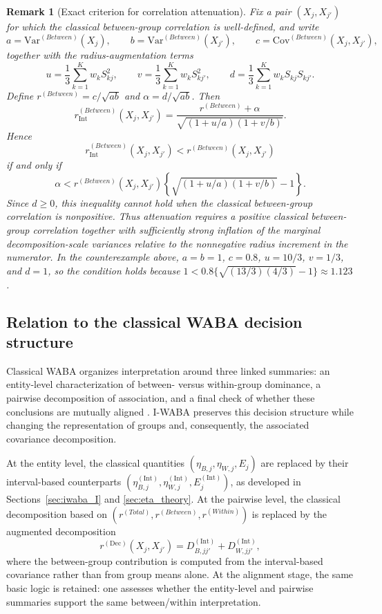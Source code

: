 \documentclass[preprint, times, 12pt, authoryear]{elsarticle}
\newtheorem{remark}{Remark}
\begin{document}
\begin{remark}[Exact criterion for correlation attenuation]\label{rem:corr_attenuation}
	Fix a pair $(X_j,X_{j'})$ for which the classical between-group correlation is well-defined, and write
	\[
	a=\mathrm{Var}^{(Between)}(X_j),\qquad
	b=\mathrm{Var}^{(Between)}(X_{j'}),\qquad
	c=\mathrm{Cov}^{(Between)}(X_j,X_{j'}),
	\]
	together with the radius-augmentation terms
	\[
	u=\frac13\sum_{k=1}^K w_k S_{kj}^2,\qquad
	v=\frac13\sum_{k=1}^K w_k S_{kj'}^2,\qquad
	d=\frac13\sum_{k=1}^K w_k S_{kj}S_{kj'}.
	\]
	Define \(r^{(Between)}=c/\sqrt{ab}\) and \(\alpha=d/\sqrt{ab}\). Then
	\[
	r_{\mathrm{Int}}^{(Between)}(X_j,X_{j'})
	=
	\frac{r^{(Between)}+\alpha}
	{\sqrt{\left(1+u/a\right)\left(1+v/b\right)}}.
	\]
	Hence
	\[
	r_{\mathrm{Int}}^{(Between)}(X_j,X_{j'})
	<
	r^{(Between)}(X_j,X_{j'})
	\]
	if and only if
	\[
	\alpha
	<
	r^{(Between)}(X_j,X_{j'})
	\left\{
	\sqrt{\left(1+u/a\right)\left(1+v/b\right)}-1
	\right\}.
	\]
	Since \(d\ge 0\), this inequality cannot hold when the classical between-group correlation is nonpositive. Thus attenuation requires a positive classical between-group correlation together with sufficiently strong inflation of the marginal decomposition-scale variances relative to the nonnegative radius increment in the numerator. In the counterexample above, \(a=b=1\), \(c=0.8\), \(u=10/3\), \(v=1/3\), and \(d=1\), so the condition holds because \(1 < 0.8\{\sqrt{(13/3)(4/3)}-1\}\approx 1.123\).
\end{remark}
 
 \subsection{Relation to the classical WABA decision structure}\label{sec:waba_testing}
 
 Classical WABA organizes interpretation around three linked summaries: an entity-level characterization of between- versus within-group dominance, a pairwise decomposition of association, and a final check of whether these conclusions are mutually aligned \citep{yammarino1992application}. I-WABA preserves this decision structure while changing the representation of groups and, consequently, the associated covariance decomposition.
 
 At the entity level, the classical quantities $(\eta_{B,j},\eta_{W,j},E_j)$ are replaced by their interval-based counterparts $(\eta_{B,j}^{(\mathrm{Int})},\eta_{W,j}^{(\mathrm{Int})},E_j^{(\mathrm{Int})})$, as developed in Sections~\ref{sec:iwaba_I} and \ref{sec:eta_theory}. At the pairwise level, the classical decomposition based on $(r^{(Total)},r^{(Between)},r^{(Within)})$ is replaced by the augmented decomposition
 \[
 r^{(\mathrm{Dec})}(X_j,X_{j'})
 =
 D_{B,jj'}^{(\mathrm{Int})}
 +
 D_{W,jj'}^{(\mathrm{Int})},
 \]
 where the between-group contribution is computed from the interval-based covariance rather than from group means alone. At the alignment stage, the same basic logic is retained: one assesses whether the entity-level and pairwise summaries support the same between/within interpretation.
 
\end{document}
